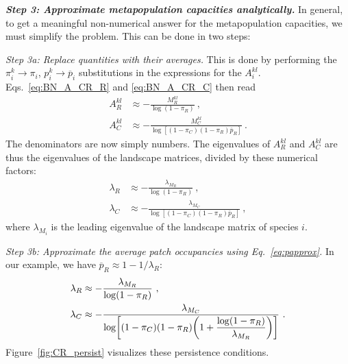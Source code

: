 \documentclass[11pt]{article}
\newcommand{\ol}[1]{\overline{#1}}
\let\originalleft\left
\let\originalright\right
\renewcommand{\left}{\mathopen{}\mathclose\bgroup\originalleft}
\renewcommand{\right}{\aftergroup\egroup\originalright}
\begin{document}
\textit{\textbf{Step 3: Approximate metapopulation capacities analytically.}}
In general, to get a meaningful non-numerical answer for the metapopulation capacities, we must simplify the problem. This can be done in two steps:

\textit{Step 3a: Replace quantities with their averages.}
This is done by performing the $\pi_i^k \rightarrow \pi_i$, $p_i^k \rightarrow \ol{p}_i$ substitutions in the expressions for the $A_i^{kl}$. Eqs.~\ref{eq:BN_A_CR_R} and \ref{eq:BN_A_CR_C} then read
\begin{align}
  \label{eq:BN_A_CR_R_nonspatial}
  A_R^{kl} &\approx -\frac{M_R^{kl}}{\log(1 - \pi_R)} \ , \\
  \label{eq:BN_A_CR_C-nonspatial}
  A_C^{kl} &\approx -\frac{M_C^{kl}}{\log[(1 - \pi_C) (1 - \pi_R) \ol{p}_R]} \ .
\end{align}
The denominators are now simply numbers. The eigenvalues of $A_R^{kl}$ and $A_C^{kl}$ are thus the eigenvalues of the landscape matrices, divided by these numerical factors:
\begin{align}
  \label{eq:BN_lambda_R_nonspatial}
  \lambda_R &\approx -\frac{\lambda_{M_R}}{\log(1-\pi_R)} \ , \\
  \label{eq:BN_lambda_C_nonspatial}
  \lambda_C &\approx -\frac{\lambda_{M_C}}{\log[(1-\pi_C) (1-\pi_R)\ol{p}_R]} \ ,
\end{align}
where $\lambda_{M_i}$ is the leading eigenvalue of the landscape matrix of species $i$.

\textit{Step 3b: Approximate the average patch occupancies using Eq.~\ref{eq:papprox}.}
In our example, we have $\ol{p}_R \approx 1 - 1 / \lambda_R$:
\begin{align}
  \label{eq:BN_lambda_R_nonspatial_2}
  \lambda_R &\approx -\frac{\lambda_{M_R}}{\log(1 - \pi_R)} \ , \\
  \label{eq:BN_lambda_C_nonspatial_2}
  \lambda_C &\approx -\frac{\lambda_{M_C}}{\log\left[ (1 - \pi_C) (1 - \pi_R)
              \left( 1 + \dfrac{\log(1 - \pi_R)}{\lambda_{M_R}}\right)\right]} \ .
\end{align}
Figure~\ref{fig:CR_persist} visualizes these persistence conditions.
\end{document}
